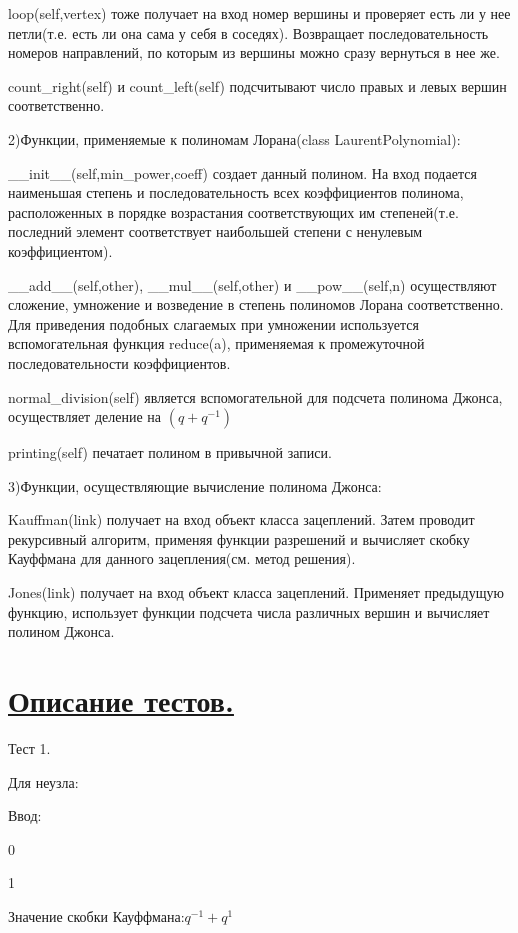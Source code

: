 \documentclass{article}
\theoremstyle{theorem}
\theoremstyle{definition}
\begin{document}
{{ loop(self,vertex) тоже получает на вход номер вершины и проверяет есть ли у нее петли(т.е. есть ли она сама у себя в соседях). Возвращает последовательность номеров направлений, по которым из вершины можно сразу вернуться в нее же.

count\_right(self) и count\_left(self) подсчитывают число правых и левых вершин соответственно.

2)Функции, применяемые к полиномам Лорана(class LaurentPolynomial):

 \_\_init\_\_(self,min\_power,coeff) создает данный полином. На вход подается наименьшая степень и последовательность всех коэффициентов полинома, расположенных в порядке возрастания соответствующих им степеней(т.е. последний элемент соответствует наибольшей степени с ненулевым коэффициентом).

 \_\_add\_\_(self,other), \_\_mul\_\_(self,other)  и  \_\_pow\_\_(self,n) осуществляют сложение, умножение и возведение в степень полиномов Лорана соответственно. Для приведения подобных слагаемых при умножении используется вспомогательная  функция reduce(a), применяемая к промежуточной последовательности коэффициентов.

normal\_division(self) является вспомогательной для подсчета полинома Джонса, осуществляет деление на $(q + q^{-1})$

 printing(self) печатает полином в привычной записи.

3)Функции, осуществляющие вычисление полинома Джонса:

Kauffman(link) получает на вход объект класса зацеплений. Затем  проводит рекурсивный алгоритм, применяя функции разрешений и вычисляет скобку Кауффмана для данного зацепления(см. метод решения).

Jones(link)  получает на вход объект класса зацеплений. Применяет предыдущую функцию, использует функции подсчета числа различных вершин и вычисляет полином Джонса.



\section{\underline{Описание тестов.}}

Тест 1.

Для неузла:

Ввод:

0

1

Значение скобки Кауффмана:$q^{-1} + q^1$

}}
\end{document}
